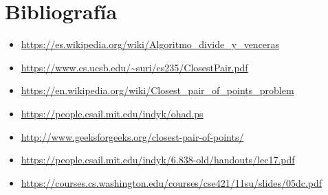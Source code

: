\documentclass{article}
\begin{document}
\section{Bibliografía}

	\begin{itemize}
		\item \url{https://es.wikipedia.org/wiki/Algoritmo_divide_y_venceras}	
		
		\item \url{https://www.cs.ucsb.edu/~suri/cs235/ClosestPair.pdf}	
		
		\item \url{https://en.wikipedia.org/wiki/Closest_pair_of_points_problem}
		
		\item \url{https://people.csail.mit.edu/indyk/ohad.ps}
		
		\item \url{http://www.geeksforgeeks.org/closest-pair-of-points/}	
		
		\item \url{https://people.csail.mit.edu/indyk/6.838-old/handouts/lec17.pdf}	
		
		\item \url{https://courses.cs.washington.edu/courses/cse421/11su/slides/05dc.pdf}
		
	\end{itemize}
\end{document}
